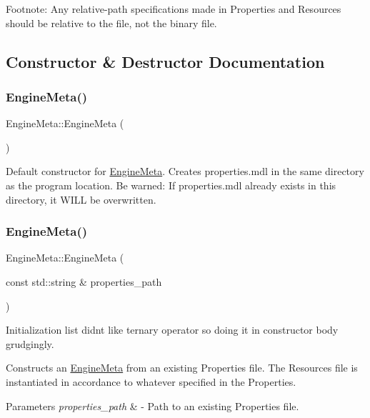 Footnote\+: Any relative-\/path specifications made in Properties and Resources should be relative to the file, not the binary file. 

\subsection{Constructor \& Destructor Documentation}
\mbox{\label{class_engine_meta_acd384c252773279afc79cfa535d6487c}} 
\subsubsection{\texorpdfstring{Engine\+Meta()}{EngineMeta()}\hspace{0.1cm}{\footnotesize\ttfamily [1/2]}}
{\footnotesize\ttfamily Engine\+Meta\+::\+Engine\+Meta (\begin{DoxyParamCaption}{ }\end{DoxyParamCaption})}

Default constructor for \mbox{\hyperlink{class_engine_meta}{Engine\+Meta}}. Creates \textquotesingle{}properties.\+mdl\textquotesingle{} in the same directory as the program location. Be warned\+: If \textquotesingle{}properties.\+mdl\textquotesingle{} already exists in this directory, it W\+I\+LL be overwritten. \mbox{\label{class_engine_meta_aead57aabdb172dd359bd34dc99c1c37e}} 
\subsubsection{\texorpdfstring{Engine\+Meta()}{EngineMeta()}\hspace{0.1cm}{\footnotesize\ttfamily [2/2]}}
{\footnotesize\ttfamily Engine\+Meta\+::\+Engine\+Meta (\begin{DoxyParamCaption}\item[{const std\+::string \&}]{properties\+\_\+path }\end{DoxyParamCaption})}



Initialization list didn\textquotesingle{}t like ternary operator so doing it in constructor body grudgingly. 

Constructs an \mbox{\hyperlink{class_engine_meta}{Engine\+Meta}} from an existing Properties file. The Resources file is instantiated in accordance to whatever specified in the Properties. 
\begin{DoxyParams}{Parameters}
{\em properties\+\_\+path} & -\/ Path to an existing Properties file. \\
\hline
\end{DoxyParams}


